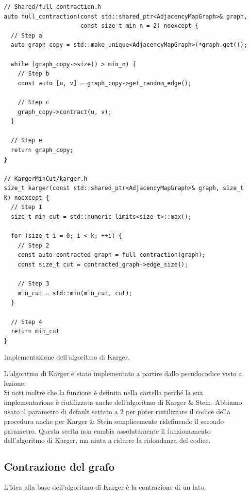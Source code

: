 \begin{listing}[!ht]
\begin{verbatim}
// Shared/full_contraction.h
auto full_contraction(const std::shared_ptr<AdjacencyMapGraph>& graph,
                      const size_t min_n = 2) noexcept {
  // Step a
  auto graph_copy = std::make_unique<AdjacencyMapGraph>(*graph.get());

  while (graph_copy->size() > min_n) {
    // Step b
    const auto [u, v] = graph_copy->get_random_edge();

    // Step c
    graph_copy->contract(u, v);
  }

  // Step e
  return graph_copy;
}

// KargerMinCut/karger.h
size_t karger(const std::shared_ptr<AdjacencyMapGraph>& graph, size_t k) noexcept {
  // Step 1
  size_t min_cut = std::numeric_limits<size_t>::max();

  for (size_t i = 0; i < k; ++i) {
    // Step 2
    const auto contracted_graph = full_contraction(graph);
    const size_t cut = contracted_graph->edge_size();

    // Step 3
    min_cut = std::min(min_cut, cut);
  }

  // Step 4
  return min_cut
}
\end{verbatim}
\caption{Implementazione dell'algoritmo di Karger.}
\label{listing:karger}
\end{listing}

\noindent L'algoritmo di Karger è stato implementato a partire dallo pseudocodice visto a lezione. \\

\vspace{10pt}
\noindent Si noti inoltre che la funzione  è definita nella cartella  perché la sua implementazione è riutilizzata anche dell'algoritmo di Karger \& Stein. Abbiamo usato il parametro di default  settato a 2 per poter riutilizzare il codice della procedura anche per Karger \& Stein semplicemente ridefinendo il secondo parametro. Questa scelta non cambia assolutamente il funzionamento dell'algoritmo di Karger, ma aiuta a ridurre la ridondanza del codice.

\subsection{Contrazione del grafo}
\label{sub:karger-contraction}

L'idea alla base dell'algoritmo di Karger è la contrazione di un lato.

